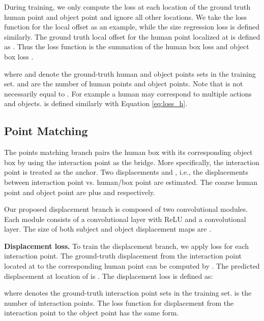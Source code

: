 \documentclass[10pt,twocolumn,letterpaper]{article}
\begin{document}
During training, we only compute the  loss at each location of the ground truth human point  and object point  and ignore all other locations. We take the loss function for the local offset as an example, while the size regression loss  is defined similarly. The ground truth local offset for the  human point localized at  is defined as . Thus the loss function  is the summation of the human box loss  and object box loss .
\vspace{-1mm}


\vspace{-1mm}

where   and   denote the ground-truth human and object points sets in the training set.
 and   are the number of  human points  and object points. Note that  is not necessarily  equal to . For example a human may correspond to multiple actions and objects.  is defined similarly with Equation \ref{eq:loss_h}.

\subsection{Point Matching}
The points matching branch pairs the human box with its corresponding object box by using the interaction point as the bridge. 
More specifically,  the interaction point is treated as the anchor. Two displacements  and , i.e.,  the displacements between interaction point vs. human/box point are estimated. The coarse human point and object point are  plus   and  respectively.






 Our proposed displacement branch is composed of two convolutional modules.  Each module consists of a  convolutional layer with ReLU and a  convolutional layer.  The size of both  subject and object displacement maps  are
 . 
 
 \textbf{Displacement loss.}  To train the displacement branch, we apply  loss for each interaction point. The ground-truth displacement from the  interaction point located at 
 to the corresponding human point can be computed by . The predicted displacement  at location of  is . The displacement loss is defined as:
 
\vspace{-1mm}

where  denotes the ground-truth interaction point sets in the training set.
 is  the number of interaction points. 
The loss function for displacement from the interaction point to the object point  has the same form. 
\end{document}
